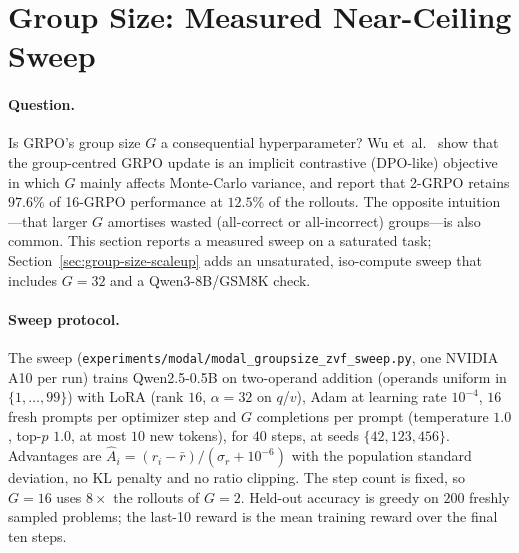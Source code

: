 \section{Group Size: Measured Near-Ceiling Sweep}
\label{sec:group-size}

\paragraph{Question.}
Is GRPO's group size $G$ a consequential hyperparameter? Wu
et~al.~\cite{wu2025grpodpo} show that the group-centred GRPO update is an implicit
contrastive (DPO-like) objective in which $G$ mainly affects Monte-Carlo variance,
and report that 2-GRPO retains $97.6\%$ of 16-GRPO performance at $12.5\%$ of the
rollouts. The opposite intuition---that larger $G$ amortises wasted (all-correct or
all-incorrect) groups---is also common. This section reports a measured sweep on a
saturated task; Section~\ref{sec:group-size-scaleup} adds an unsaturated,
iso-compute sweep that includes $G{=}32$ and a Qwen3-8B/GSM8K check.

\paragraph{Sweep protocol.}
The sweep (\texttt{experiments/modal/modal\_groupsize\_zvf\_sweep.py}, one NVIDIA
A10 per run) trains Qwen2.5-0.5B on two-operand addition (operands uniform in
$\{1,\dots,99\}$) with LoRA (rank $16$, $\alpha{=}32$ on $q$/$v$), Adam at
learning rate $10^{-4}$, $16$ fresh prompts per optimizer step and $G$ completions
per prompt (temperature $1.0$, top-$p$ $1.0$, at most $10$ new tokens), for $40$
steps, at seeds $\{42,123,456\}$. Advantages are
$\hat A_i=(r_i-\bar r)/(\sigma_r+10^{-6})$ with the population standard deviation,
no KL penalty and no ratio clipping. The step count is fixed, so $G{=}16$ uses
$8\times$ the rollouts of $G{=}2$. Held-out accuracy is greedy on $200$ freshly
sampled problems; the last-10 reward is the mean training reward over the final
ten steps.

